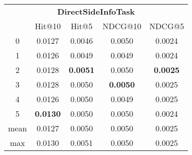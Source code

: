 \documentclass{article}
\begin{document}
 

\begin{tabular}{c|cccc}

\multicolumn{5}{c}{\textbf{DirectSideInfoTask}} \\
\noalign{\smallskip}
\noalign{\smallskip}
\toprule
\multicolumn{1}{c}{Template ID} & \multicolumn{1}{|c}{Hit@10} & \multicolumn{1}{c}{Hit@5} & \multicolumn{1}{c}{NDCG@10} & \multicolumn{1}{c}{NDCG@5} \\
\midrule
0 & 0.0127 & 0.0046 & 0.0050 & 0.0024 \\
1 & 0.0126 & 0.0049 & 0.0049 & 0.0024 \\
2 & 0.0128 & \textbf{0.0051} & 0.0050 & \textbf{0.0025} \\
3 & 0.0128 & 0.0050 & \textbf{0.0050} & 0.0025 \\
4 & 0.0126 & 0.0050 & 0.0049 & 0.0025 \\
5 & \textbf{0.0130} & 0.0050 & 0.0050 & 0.0024 \\
\midrule
mean & 0.0127 & 0.0050 & 0.0050 & 0.0025 \\
max & 0.0130 & 0.0051 & 0.0050 & 0.0025 \\
\bottomrule

\end{tabular}
\end{document}
